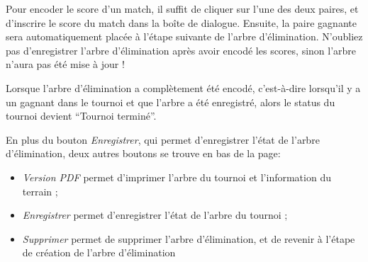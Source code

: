 Pour encoder le score d'un match, il suffit de cliquer sur l'une des deux paires, et d'inscrire le score du match dans la boîte de dialogue. Ensuite, la paire gagnante sera automatiquement placée à l'étape suivante de l'arbre d'élimination. N'oubliez pas d'enregistrer l'arbre d'élimination après avoir encodé les scores, sinon l'arbre n'aura pas été mise à jour !\newline

Lorsque l'arbre d'élimination a complètement été encodé, c'est-à-dire lorsqu'il y a un gagnant dans le tournoi et que l'arbre a été enregistré, alors le status du tournoi devient \enquote{Tournoi terminé}.\newline

En plus du bouton \textit{Enregistrer}, qui permet d'enregistrer l'état de l'arbre d'élimination, deux autres boutons se trouve en bas de la page:

\begin{itemize}
\item \textit{Version PDF} permet d'imprimer l'arbre du tournoi et l'information du terrain ;
\item \textit{Enregistrer} permet d'enregistrer l'état de l'arbre du tournoi ;
\item \textit{Supprimer} permet de supprimer l'arbre d'élimination, et de revenir à l'étape de création de l'arbre d'élimination
\end{itemize}
\bigskip